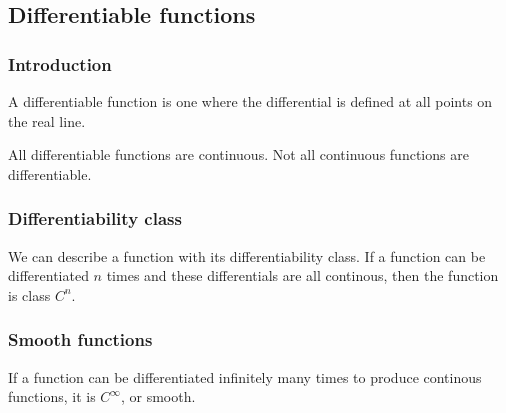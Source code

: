 
\subsection{Differentiable functions}

\subsubsection{Introduction}

A differentiable function is one where the differential is defined at all points on the real line.

All differentiable functions are continuous. Not all continuous functions are differentiable.

\subsubsection{Differentiability class}

We can describe a function with its differentiability class. If a function can be differentiated \(n\) times and these differentials are all continous, then the function is class \(C^n\).

\subsubsection{Smooth functions}

If a function can be differentiated infinitely many times to produce continous functions, it is \(C^{\infty }\), or smooth.

